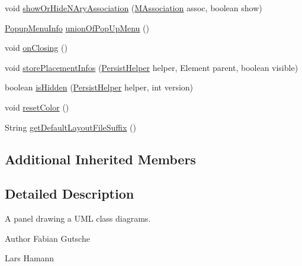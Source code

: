 \begin{DoxyCompactItemize}
\item 
void \hyperlink{classorg_1_1tzi_1_1use_1_1gui_1_1views_1_1diagrams_1_1classdiagram_1_1_class_diagram_a1e33ceae6ce77071bf0aa791521b8e2d}{show\-Or\-Hide\-N\-Ary\-Association} (\hyperlink{interfaceorg_1_1tzi_1_1use_1_1uml_1_1mm_1_1_m_association}{M\-Association} assoc, boolean show)
\item 
\hyperlink{classorg_1_1tzi_1_1use_1_1gui_1_1views_1_1diagrams_1_1_diagram_view_1_1_popup_menu_info}{Popup\-Menu\-Info} \hyperlink{classorg_1_1tzi_1_1use_1_1gui_1_1views_1_1diagrams_1_1classdiagram_1_1_class_diagram_a63e80a827c9a970896f3b52c2d606865}{union\-Of\-Pop\-Up\-Menu} ()
\item 
void \hyperlink{classorg_1_1tzi_1_1use_1_1gui_1_1views_1_1diagrams_1_1classdiagram_1_1_class_diagram_af90d5ff2127eaaefe67ff2a25c7edc84}{on\-Closing} ()
\item 
void \hyperlink{classorg_1_1tzi_1_1use_1_1gui_1_1views_1_1diagrams_1_1classdiagram_1_1_class_diagram_a73b54d75c1c88b810a1f01d9a8f59a09}{store\-Placement\-Infos} (\hyperlink{classorg_1_1tzi_1_1use_1_1gui_1_1util_1_1_persist_helper}{Persist\-Helper} helper, Element parent, boolean visible)
\item 
boolean \hyperlink{classorg_1_1tzi_1_1use_1_1gui_1_1views_1_1diagrams_1_1classdiagram_1_1_class_diagram_aeb615e9e0cbcc3dfc6294c261d81f187}{is\-Hidden} (\hyperlink{classorg_1_1tzi_1_1use_1_1gui_1_1util_1_1_persist_helper}{Persist\-Helper} helper, int version)
\item 
void \hyperlink{classorg_1_1tzi_1_1use_1_1gui_1_1views_1_1diagrams_1_1classdiagram_1_1_class_diagram_a84062f072120e3de003132bf502f633e}{reset\-Color} ()
\item 
String \hyperlink{classorg_1_1tzi_1_1use_1_1gui_1_1views_1_1diagrams_1_1classdiagram_1_1_class_diagram_a7dd3e230c9ef2616088e7509fec879f5}{get\-Default\-Layout\-File\-Suffix} ()
\end{DoxyCompactItemize}
\subsection*{Additional Inherited Members}


\subsection{Detailed Description}
A panel drawing a U\-M\-L class diagrams.

\begin{DoxyAuthor}{Author}
Fabian Gutsche 

Lars Hamann 
\end{DoxyAuthor}


